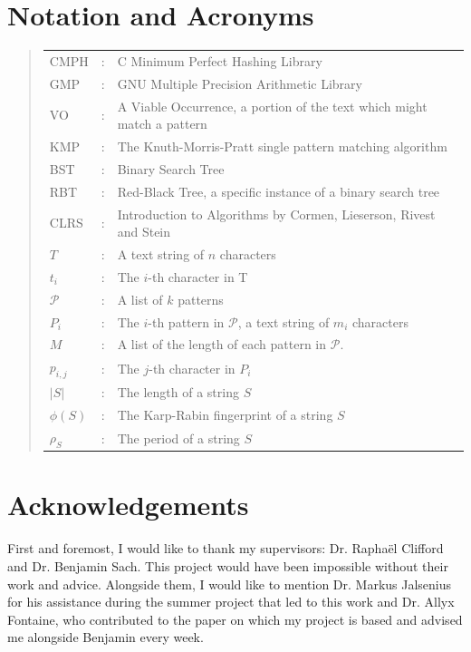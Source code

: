\documentclass[ %
                    author={Dominic Joseph Moylett},
                    degree={MEng},
                     title={Dictionary Matching with Fingerprints},
                  subtitle={An Empirical Analysis},
                      type={research},
                      year={2015} ]{dissertation}
\begin{document}

\chapter*{Notation and Acronyms}

\begin{quote}
\begin{tabular}{lcl}
CMPH &: & C Minimum Perfect Hashing Library \\
GMP &: & GNU Multiple Precision Arithmetic Library \\
VO &: & A Viable Occurrence, a portion of the text which might match a pattern \\
KMP &: & The Knuth-Morris-Pratt single pattern matching algorithm \\
BST &: & Binary Search Tree \\
RBT &: & Red-Black Tree, a specific instance of a binary search tree \\
CLRS &: & Introduction to Algorithms by Cormen, Lieserson, Rivest and Stein \\
$T$ &: & A text string of $n$ characters \\
$t_i$ &: & The $i$-th character in T \\
$\mathcal{P}$ &: & A list of $k$ patterns \\
$P_i$ &: & The $i$-th pattern in $\mathcal{P}$, a text string of $m_i$ characters \\
$M$ &: & A list of the length of each pattern in $\mathcal{P}$. \\
$p_{i,j}$ &: & The $j$-th character in $P_i$ \\
$|S|$ &: & The length of a string $S$ \\
$\phi(S)$ &: & The Karp-Rabin fingerprint of a string $S$ \\
$\rho_S$ &: & The period of a string $S$ \\
\end{tabular}
\end{quote}


\chapter*{Acknowledgements}

First and foremost, I would like to thank my supervisors: Dr. Rapha\"{e}l Clifford and Dr. Benjamin Sach. This project would have been impossible without their work and advice. Alongside them, I would like to mention Dr. Markus Jalsenius for his assistance during the summer project that led to this work and Dr. Allyx Fontaine, who contributed to the paper on which my project is based and advised me alongside Benjamin every week.
\end{document}
